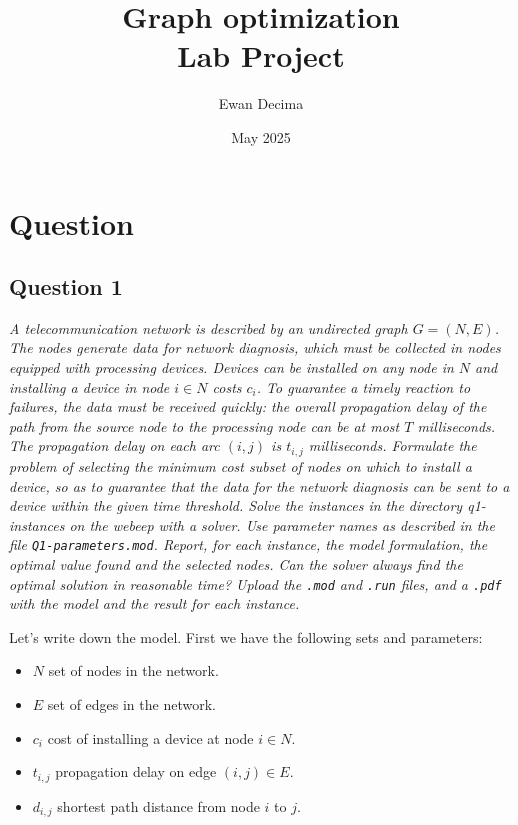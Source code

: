 \documentclass[10pt]{article}
\title{Graph optimization \\ Lab Project}
\author{Ewan Decima }
\date{May 2025}
\begin{document}
    \maketitle

    \section{Question}

    \subsection*{Question 1}
    \textit{A telecommunication network is described by an undirected graph $G=(N,E)$. The nodes generate data for network diagnosis, which must be collected in nodes equipped with processing devices. Devices can be installed on any node in $N$ and installing a device in node $i \in N$ costs $c_i$. To guarantee a timely reaction to failures, the data must be received quickly: the overall propagation delay of the path from the source node to the processing node can be at most $T$ milliseconds. The propagation delay on each arc $(i,j)$ is $t_{i,j}$ milliseconds. Formulate the problem of selecting the minimum cost subset of nodes on which to install a device, so as to guarantee that the data for the network diagnosis can be sent to a device within the given time threshold.
    Solve the instances in the directory q1-instances on the webeep with a solver. Use parameter names as described in the file \texttt{Q1-parameters.mod}.
    Report, for each instance, the model formulation, the optimal value found and the selected nodes. Can the solver always find the optimal solution in reasonable time? Upload the \texttt{.mod} and \texttt{.run} files, and a \texttt{.pdf} with the model and the result for each instance.}

    \vspace{1 cm}
    Let's write down the model. First we have the following sets and parameters:
    \begin{itemize}
        \item $N$ set of nodes in the network.
        \item $E$ set of edges in the network.
        \item $c_i$ cost of installing a device at node $i \in N$.
        \item $t_{i,j}$ propagation delay on edge $(i,j) \in E$.
        \item $d_{i,j}$ shortest path distance from node $i$ to $j$.
    \end{itemize}
\end{document}
